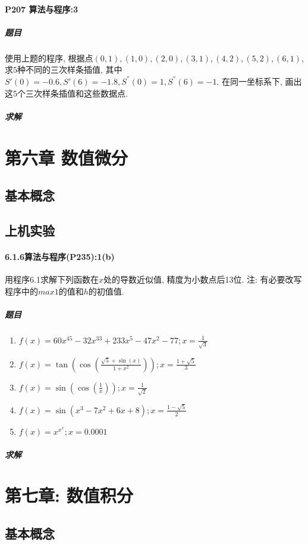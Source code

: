 \documentclass{ctexart}
\begin{document}
\paragraph{P207 算法与程序:3}
\subparagraph{题目}
使用上题的程序, 根据点$\left(0,1\right), \left(1,0\right), \left(2,0\right), \left(3,1\right), \left(4,2\right), \left(5,2\right),\left(6,1\right)$, 求$5$种不同的三次样条插值, 其中$S'\left(0\right) = -0.6, S'\left(6\right)=-1.8,S^{''}\left(0\right)=1,S^{''}\left(6\right)=-1$. 在同一坐标系下, 画出这5个三次样条插值和这些数据点.
\subparagraph{求解}
\section{第六章 数值微分}
\subsection{基本概念}
\subsection{上机实验}
\paragraph{6.1.6算法与程序(P235):1(b)}
用程序6.1求解下列函数在$x$处的导数近似值, 精度为小数点后13位. 注: 有必要改写程序中的$max1$的值和$h$的初值值.
\subparagraph{题目}
\begin{enumerate}
	\item $f\left(x\right) = 60x^{45}-32x^{33}+233x^{5}-47x^{2}-77; x=\frac{1}{\sqrt{3}}$
	\item $f\left(x\right) = \tan\left(\cos\left(\frac{\sqrt{5}+\sin\left(x\right)}{1+x^2}\right)\right); x=\frac{1+\sqrt{5}}{3}$
	\item $f\left(x\right) = \sin\left(\cos\left(\frac{1}{x}\right)\right); x=\frac{1}{\sqrt{2}}$
	\item $f\left(x\right) = \sin\left(x^3-7x^2+6x+8\right); x=\frac{1-\sqrt{5}}{2}$
	\item $f\left(x\right) = x^{x^{x}}; x=0.0001$
\end{enumerate}
\subparagraph{求解}

\section{第七章: 数值积分}
\subsection{基本概念}
\end{document}
